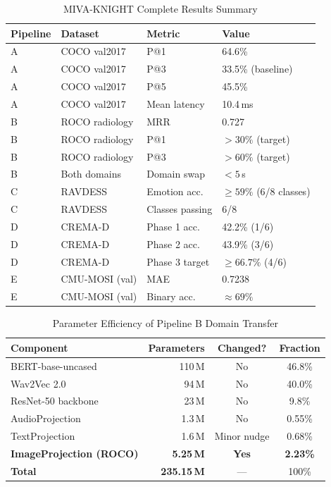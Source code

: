 \documentclass[12pt,a4paper]{article}
\theoremstyle{definition}
\theoremstyle{plain}
\theoremstyle{remark}
\begin{document}
\begin{table}[H]
\centering
\caption{MIVA-KNIGHT Complete Results Summary}
\begin{tabular}{llll}
\toprule
\textbf{Pipeline} & \textbf{Dataset} & \textbf{Metric} & \textbf{Value} \\
\midrule
A & COCO val2017 & P@1 & 64.6\% \\
A & COCO val2017 & P@3 & 33.5\% (baseline) \\
A & COCO val2017 & P@5 & 45.5\% \\
A & COCO val2017 & Mean latency & 10.4\,ms \\
\midrule
B & ROCO radiology & MRR & 0.727 \\
B & ROCO radiology & P@1 & $> 30\%$ (target) \\
B & ROCO radiology & P@3 & $> 60\%$ (target) \\
B & Both domains & Domain swap & $< 5$\,s \\
\midrule
C & RAVDESS & Emotion acc. & $\geq 59\%$ (6/8 classes) \\
C & RAVDESS & Classes passing & 6/8 \\
\midrule
D & CREMA-D & Phase 1 acc. & 42.2\% (1/6) \\
D & CREMA-D & Phase 2 acc. & 43.9\% (3/6) \\
D & CREMA-D & Phase 3 target & $\geq 66.7\%$ (4/6) \\
\midrule
E & CMU-MOSI (val) & MAE & 0.7238 \\
E & CMU-MOSI (val) & Binary acc. & $\approx 69\%$ \\
\bottomrule
\end{tabular}
\end{table}

\begin{table}[H]
\centering
\caption{Parameter Efficiency of Pipeline B Domain Transfer}
\begin{tabular}{lrcc}
\toprule
\textbf{Component} & \textbf{Parameters} & \textbf{Changed?} & \textbf{Fraction} \\
\midrule
BERT-base-uncased & 110\,M & No & 46.8\% \\
Wav2Vec 2.0 & 94\,M & No & 40.0\% \\
ResNet-50 backbone & 23\,M & No & 9.8\% \\
AudioProjection & 1.3\,M & No & 0.55\% \\
TextProjection & 1.6\,M & Minor nudge & 0.68\% \\
\rowcolor{boxorange}\textbf{ImageProjection (ROCO)} & \textbf{5.25\,M} & \textbf{Yes} & \textbf{2.23\%} \\
\midrule
\textbf{Total} & \textbf{235.15\,M} & --- & 100\% \\
\bottomrule
\end{tabular}
\end{table}
\end{document}
